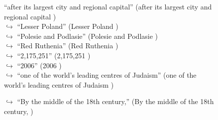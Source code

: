 \documentclass[11pt,a4paper, onecolumn]{article}
\begin{document}
\begin{figure}[t]
\begin{tcolorbox}[boxsep=0pt,left=5pt,right=0pt,top=2pt,colback = yellow!5]
\begin{dialogue}
{ ``after its largest city and regional capital'' (after its largest city and regional capital ) }
\\
\colorbox{pink!25}{$\hookrightarrow$}
{ ``Lesser Poland'' (Lesser Poland ) }
\\
\colorbox{pink!25}{$\hookrightarrow$}
{ ``Polesie and Podlasie'' (Polesie and Podlasie ) }
\\
\colorbox{pink!25}{$\hookrightarrow$}
{ ``Red Ruthenia'' (Red Ruthenia ) }
\\
\colorbox{pink!25}{$\hookrightarrow$}
{ ``2,175,251'' (2,175,251 ) }
\\
\colorbox{pink!25}{$\hookrightarrow$}
{ ``2006'' (2006 ) }
\\
\colorbox{pink!25}{$\hookrightarrow$}
{ ``one of the world's leading centres of Judaism'' (one of the world's leading centres of Judaism ) }
 \end{dialogue}\end{tcolorbox}\end{figure}\begin{figure}[t] \small \begin{tcolorbox}[boxsep=0pt,left=5pt,right=0pt,top=2pt,colback = yellow!5] \begin{dialogue}
 \small 
\colorbox{pink!25}{$\hookrightarrow$}
{ ``By the middle of the 18th century,'' (By the middle of the 18th century, ) }
\\
 \end{dialogue}\end{tcolorbox}\end{figure}
\end{document}
